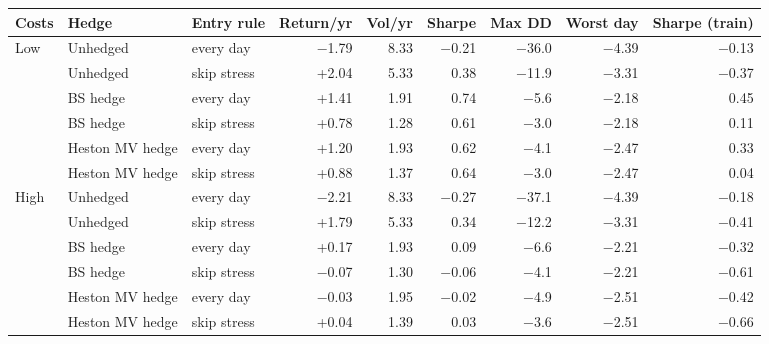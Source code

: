\begin{tabular}{lllrrrrrr}
\toprule
Costs & Hedge & Entry rule & Return/yr & Vol/yr & Sharpe & Max DD & Worst day & Sharpe (train) \\
\midrule
Low & Unhedged & every day & $-$1.79 & 8.33 & $-$0.21 & $-$36.0 & $-$4.39 & $-$0.13 \\
 & Unhedged & skip stress & +2.04 & 5.33 & 0.38 & $-$11.9 & $-$3.31 & $-$0.37 \\
 & BS hedge & every day & +1.41 & 1.91 & 0.74 & $-$5.6 & $-$2.18 & 0.45 \\
 & BS hedge & skip stress & +0.78 & 1.28 & 0.61 & $-$3.0 & $-$2.18 & 0.11 \\
 & Heston MV hedge & every day & +1.20 & 1.93 & 0.62 & $-$4.1 & $-$2.47 & 0.33 \\
 & Heston MV hedge & skip stress & +0.88 & 1.37 & 0.64 & $-$3.0 & $-$2.47 & 0.04 \\
\midrule
High & Unhedged & every day & $-$2.21 & 8.33 & $-$0.27 & $-$37.1 & $-$4.39 & $-$0.18 \\
 & Unhedged & skip stress & +1.79 & 5.33 & 0.34 & $-$12.2 & $-$3.31 & $-$0.41 \\
 & BS hedge & every day & +0.17 & 1.93 & 0.09 & $-$6.6 & $-$2.21 & $-$0.32 \\
 & BS hedge & skip stress & $-$0.07 & 1.30 & $-$0.06 & $-$4.1 & $-$2.21 & $-$0.61 \\
 & Heston MV hedge & every day & $-$0.03 & 1.95 & $-$0.02 & $-$4.9 & $-$2.51 & $-$0.42 \\
 & Heston MV hedge & skip stress & +0.04 & 1.39 & 0.03 & $-$3.6 & $-$2.51 & $-$0.66 \\
\bottomrule
\end{tabular}

